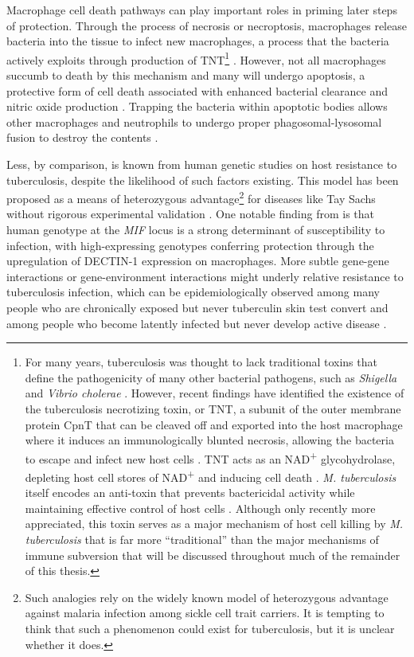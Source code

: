 Macrophage cell death pathways can play important roles in priming later steps of protection. Through the process of necrosis or necroptosis, macrophages release bacteria into the tissue to infect new macrophages, a process that the bacteria actively exploits through production of TNT\footnote{For many years, tuberculosis was thought to lack traditional toxins that define the pathogenicity of many other bacterial pathogens, such as \textit{Shigella} and \textit{Vibrio cholerae} \citep{Gyles2007, Tesh1991, Holmgren1981, Guichard2013}. However, recent findings have identified the existence of the tuberculosis necrotizing toxin, or TNT, a subunit of the outer membrane protein CpnT that can be cleaved off and exported into the host macrophage where it induces an immunologically blunted necrosis, allowing the bacteria to escape and infect new host cells \citep{Danilchanka2014, Pajuelo2021, Tak2021, IzquierdoLafuente2021}. TNT acts as an NAD\textsuperscript{+} glycohydrolase, depleting host cell stores of NAD\textsuperscript{+} and inducing cell death \citep{Sun2015, Tak2019, Pajuelo2020}. \textit{M. tuberculosis} itself encodes an anti\hyp{}toxin that prevents bactericidal activity while maintaining effective control of host cells \citep{Sun2015}. Although only recently more appreciated, this toxin serves as a major mechanism of host cell killing by \textit{M. tuberculosis} that is far more ``traditional'' than the major mechanisms of immune subversion that will be discussed throughout much of the remainder of this thesis.} \citep{Guirado2013a, Pajuelo2018}. However, not all macrophages succumb to death by this mechanism and many will undergo apoptosis, a protective form of cell death associated with enhanced bacterial clearance and nitric oxide production \citep{Divangahi2013, Herbst2011}. Trapping the bacteria within apoptotic bodies allows other macrophages and neutrophils to undergo proper phagosomal\hyp{}lysosomal fusion to destroy the contents \citep{Dallenga2017, Molloy1994, Mahamed2017, Behar2011}.

Less, by comparison, is known from human genetic studies on host resistance to tuberculosis, despite the likelihood of such factors existing. This model has been proposed as a means of heterozygous advantage\footnote{Such analogies rely on the widely known model of heterozygous advantage against malaria infection among sickle cell trait carriers. It is tempting to think that such a phenomenon could exist for tuberculosis, but it is unclear whether it does.} for diseases like Tay Sachs without rigorous experimental validation \citep{Spyropoulous1981}. One notable finding from \citet{Das2013b} is that human genotype at the \textit{MIF} locus is a strong determinant of susceptibility to infection, with high\hyp{}expressing genotypes conferring protection through the upregulation of DECTIN\hyp{}1 expression on macrophages. More subtle gene\hyp{}gene interactions or gene\hyp{}environment interactions might underly relative resistance to tuberculosis infection, which can be epidemiologically observed among many people who are chronically exposed but never tuberculin skin test convert and among people who become latently infected but never develop active disease \citep{Flynn2011, Orme2015}.

